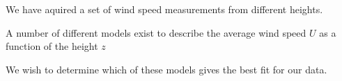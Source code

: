 We have aquired a set of wind speed measurements from different heights. 


A number of different models exist to describe the average wind speed $U$ as a
function of the height $z$




We wish to determine which of these models gives the best fit for our data. 








